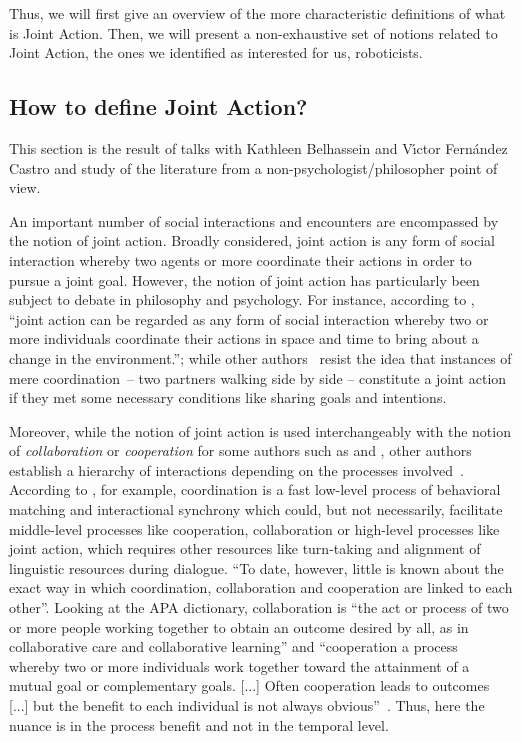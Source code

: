 \documentclass[a4paper,11pt,twoside]{StyleThese}
\begin{document}
Thus, we will first give an overview of the more characteristic definitions of what is Joint Action. Then, we will present a non-exhaustive set of notions related to Joint Action, the ones we identified as interested for us, roboticists.

\subsection{How to define Joint Action?}\label{chap1:subsec:def_ja}

This section is the result of talks with Kathleen Belhassein and V{\'\i}ctor Fern{\'a}ndez Castro and study of the literature from a non-psychologist/philosopher point of view.

An important number of social interactions and encounters are encompassed by the notion of joint action. Broadly considered, joint action is any form of social interaction whereby two agents or more coordinate their actions in order to pursue a joint goal. However, the notion of joint action has particularly been subject to debate in philosophy and psychology. For instance, according to \citet[p.~70]{sebanz_2006_joint}, ``joint action can be regarded as
any form of social interaction whereby two or more individuals coordinate their actions in space and time to bring about a change in the environment.''; while other authors~\citep{carpenter_2009_just, cohen_1991_teamwork, fiebich_2013_joint, tomasello_2005_understanding,pacherie_2012_agency} resist the idea that instances of mere coordination – \eg two partners walking side by side – constitute a joint action if they met some necessary conditions like sharing goals and intentions.

Moreover, while the notion of joint action is used interchangeably with the notion of \emph{collaboration} or \emph{cooperation} for some authors such as \cite{becchio_2010_toward} and \cite{kobayashi_2018_language}, other authors establish a hierarchy of interactions depending on the processes involved~\citep{amici_2015_coordination, chalmeau_1995_cooperation}. According to \cite[p.~vii]{amici_2015_coordination}, for example, coordination is a fast low-level process of behavioral matching and interactional synchrony which could, but not necessarily, facilitate middle-level processes like cooperation, collaboration or high-level processes like joint action, which requires other resources like turn-taking and alignment of linguistic resources during dialogue. ``To date, however, little is known about the exact way in which coordination, collaboration and cooperation are linked to each other''. Looking at the APA dictionary, collaboration is ``the act or process of two or more people working together to obtain an outcome desired by all, as in collaborative care and collaborative learning'' and ``cooperation a process whereby two or more individuals work together toward the attainment of a mutual goal
or complementary goals. [...] Often cooperation leads to outcomes [...] but the benefit to each individual is not always obvious''~\citep{sharbrough_2015_apa}. Thus, here the nuance is in the process benefit and not in the temporal level.
\end{document}
